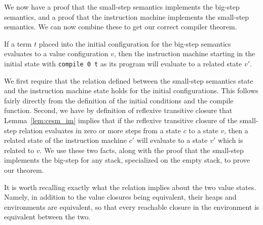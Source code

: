 We now have a proof that the small-step semantics implements the big-step
semantics, and a proof that the instruction machine implements the small-step
semantics. We can now combine these to get our correct compiler theorem. 

\begin{thm} 
\label{thm:correctness}
If a term $t$ placed into the initial configuration for the big-step semantics
evaluates to a value configuration $v$, then the instruction machine starting
in the initial state with \texttt{compile 0 t} as its program will evaluate to a
related state $v'$.  
\end{thm}
\begin{proofoutline}
We first require that the relation defined between the small-step semantics
state and the instruction machine state holds for the initial configurations.
This follows fairly directly from the definition of the initial conditions and
the compile function. Second, we have by definition of reflexive transitive
closure that Lemma~\ref{lem:cesm_im} implies that if the reflexive transitive
closure of the small-step relation evaluates in zero or more steps from a
state $c$ to a state $v$, then a related state of the instruction machine $c'$
will evaluate to a state $v'$ which is related to $v$. We use these two facts,
along with the proof that the small-step implements the big-step for any stack,
specialized on the empty stack, to prove our theorem. 
\end{proofoutline}

It is worth recalling exactly what the relation implies about the two value
states. Namely, in addition to the value closures being equivalent, their heaps
and environments are equivalent, so that every reachable closure in the
environment is equivalent between the two.


